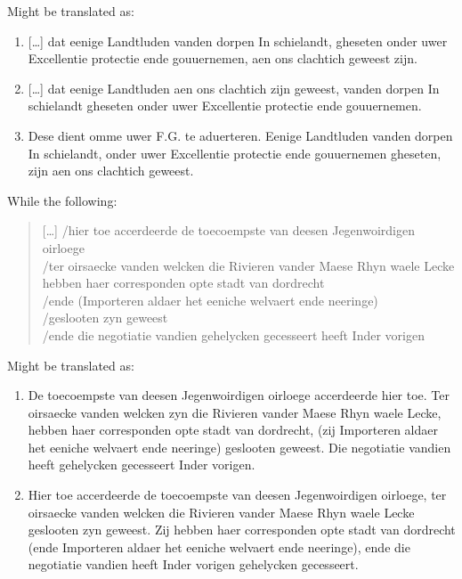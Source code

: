 \begin{paper}
\noindent Might be translated as:

\begin{enumerate}\footnotesize
\def\labelenumi{\arabic{enumi}.}
\item {[}\ldots{}{]} dat eenige Landtluden vanden dorpen In schielandt, gheseten  onder uwer Excellentie protectie ende gouuernemen, aen ons clachtich geweest zijn.
\item {[}\ldots{}{]} dat eenige Landtluden aen ons clachtich zijn geweest, vanden dorpen In schielandt gheseten onder uwer Excellentie protectie ende gouuernemen.
\item Dese dient omme uwer F.G. te aduerteren. Eenige Landtluden vanden dorpen In schielandt, onder uwer Excellentie protectie ende gouuernemen gheseten, zijn aen ons clachtich geweest.
\end{enumerate}

\noindent While the following: 

\begin{quote}
{[}\ldots{}{]} /hier toe accerdeerde de toecoempste van deesen Jegenwoirdigen
oirloege\\
/ter oirsaecke vanden welcken die Rivieren vander Maese Rhyn waele Lecke
hebben haer corresponden opte stadt van dordrecht\\
/ende (Importeren aldaer het eeniche welvaert ende neeringe)\\
/geslooten zyn geweest\\
/ende die negotiatie vandien gehelycken gecesseert heeft Inder
vorigen\\
\begin{flushright}
\end{flushright}
\end{quote}

\noindent Might be translated as: 

\begin{enumerate}\footnotesize
\def\labelenumi{\arabic{enumi}.}
\item De toecoempste van deesen Jegenwoirdigen oirloege {accerdeerde hier toe}. Ter oirsaecke vanden welcken {zyn} die Rivieren vander Maese Rhyn waele Lecke, hebben haer corresponden opte stadt van dordrecht, ({zij} Importeren aldaer het eeniche welvaert ende neeringe) geslooten geweest. Die negotiatie vandien {heeft} gehelycken gecesseert Inder vorigen.
\item Hier toe accerdeerde de toecoempste van deesen Jegenwoirdigen
  oirloege, ter oirsaecke vanden welcken die Rivieren vander Maese Rhyn waele Lecke {geslooten zyn geweest}. {Zij} hebben haer corresponden opte stadt van dordrecht ({ende} Importeren aldaer het eeniche welvaert ende neeringe), ende die negotiatie vandien {heeft Inder vorigen} gehelycken gecesseert.
\end{enumerate}


\end{paper}

